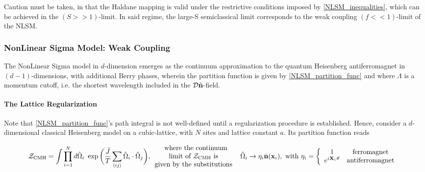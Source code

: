 Caution must be taken, in that the Haldane mapping is valid under the restrictive conditions imposed by \cref{NLSM_inequalities}, which can be achieved in the $(S>>1)$-limit. In said regime, the large-S semiclassical limit corresponds to the weak coupling $(f<<1)$-limit of the NLSM. \\

\subsubsection{NonLinear Sigma Model: Weak Coupling}

The NonLinear Sigma model in $d$-dimension emerges as the continuum approximation to the quantum Heisenberg antiferromagnet in $(d-1)$-dimensions, with additional Berry phases, wherein the partition function is given by \cref{NLSM_partition_func} and where $\Lambda$ is a momentum cutoff, i.e. the shortest wavelength included in the $\mathcal{D}\hat{{\bf n}}$-field. \\

\paragraph{The Lattice Regularization}

Note that \cref{NLSM_partition_func}'s path integral is not well-defined until a regularization procedure is established. Hence, consider a $d$-dimensional classical Heisenberg model on a cubic-lattice, with $N$ sites and lattice constant $a$. Its partition function reads 

\begin{equation}
    \mathcal{Z}_{\textnormal{CMH}} = \int \prod_{i=1}^{N} d\hat{\Omega}_i \textnormal{ } \exp \bigg(\frac{\bar{J}}{T} \sum_{\langle ij \rangle} \hat{\Omega}_i \cdot \hat{\Omega}_j\bigg), \begin{array}{c}
         \textnormal{ where the continuum} \\
         \textnormal{limit of $\mathcal{Z}_{\textnormal{CMH}}$ is } \\
         \textnormal{given by the substitutions } 
    \end{array}
    \textnormal{ } \hat{\Omega}_i  \rightarrow \eta_i \hat{{\bf n}}({\bf x}_i), \textnormal{ with } \eta_i = \left\{\begin{array}{cc}
              1 & \textnormal{ferromagnet } \\
              e^{i {\bf X}_i \vec{\pi}} & \textnormal{antiferromagnet }
         \end{array}  \right.
\end{equation}


